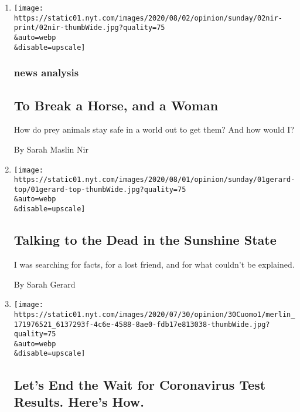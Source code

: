 \begin{enumerate}
\def\labelenumi{\arabic{enumi}.}
\item
  \href{/2020/08/02/sunday-review/horse-crazy-nir-language.html}{}

  \texttt{[image: https://static01.nyt.com/images/2020/08/02/opinion/sunday/02nir-print/02nir-thumbWide.jpg?quality=75\\\&auto=webp\\\&disable=upscale]}

  \hypertarget{news-analysis}{%
  \subsubsection{news analysis}\label{news-analysis}}

  \hypertarget{to-break-a-horse-and-a-woman}{%
  \subsection{To Break a Horse, and a
  Woman}\label{to-break-a-horse-and-a-woman}}

  How do prey animals stay safe in a world out to get them? And how
  would I?

  By Sarah Maslin Nir
\item
  \href{/2020/08/01/opinion/spiritualism-cassadaga-florida.html}{}

  \texttt{[image: https://static01.nyt.com/images/2020/08/01/opinion/sunday/01gerard-top/01gerard-top-thumbWide.jpg?quality=75\\\&auto=webp\\\&disable=upscale]}

  \hypertarget{talking-to-the-dead-in-the-sunshine-state}{%
  \subsection{Talking to the Dead in the Sunshine
  State}\label{talking-to-the-dead-in-the-sunshine-state}}

  I was searching for facts, for a lost friend, and for what couldn't be
  explained.

  By Sarah Gerard
\item
  \href{/2020/07/31/opinion/coronavirus-testing-cuomo.html}{}

  \texttt{[image: https://static01.nyt.com/images/2020/07/30/opinion/30Cuomo1/merlin\_171976521\_6137293f-4c6e-4588-8ae0-fdb17e813038-thumbWide.jpg?quality=75\\\&auto=webp\\\&disable=upscale]}

  \hypertarget{lets-end-the-wait-for-coronavirus-test-results-heres-how}{%
  \subsection{Let's End the Wait for Coronavirus Test Results. Here's
  How.}\label{lets-end-the-wait-for-coronavirus-test-results-heres-how}}


\end{enumerate}
